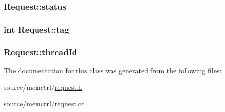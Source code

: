 \hypertarget{classRequest_48599e50c349bc0a36d886a24a7e578e}{
\subsubsection[{status}]{ {\bf Request::status}}}
\label{classRequest_48599e50c349bc0a36d886a24a7e578e}


\hypertarget{classRequest_49202d5503dd1922eacac0c589f766a9}{
\subsubsection[{tag}]{\setlength{\rightskip}{0pt plus 5cm}int {\bf Request::tag}}}
\label{classRequest_49202d5503dd1922eacac0c589f766a9}


\hypertarget{classRequest_a828a07438920f87df95ab6b795f39fa}{
\subsubsection[{threadId}]{ {\bf Request::threadId}}}
\label{classRequest_a828a07438920f87df95ab6b795f39fa}




The documentation for this class was generated from the following files:\begin{CompactItemize}
\item 
source/memctrl/\hyperlink{request_8h}{request.h}\item 
source/memctrl/\hyperlink{request_8cc}{request.cc}\end{CompactItemize}
